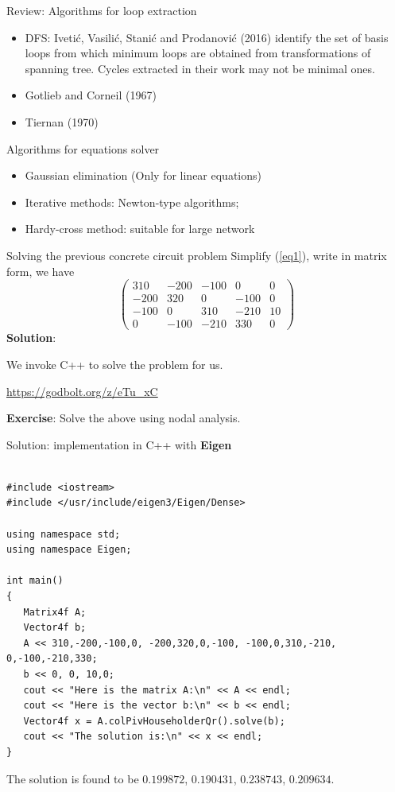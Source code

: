 \documentclass[xcolor=dvipsnames]{beamer}
\begin{document}
\begin{frame}{Review: Algorithms for loop extraction}
	\begin{itemize}
		\item DFS: Iveti\'c, Vasili\'c, Stani\'c and Prodanovi\'c (2016) identify the set of basis loops from which
		minimum loops are obtained from transformations of spanning tree. Cycles extracted in their work may not 
		be minimal ones.
		\item Gotlieb and Corneil (1967)
		\item Tiernan (1970)
	\end{itemize}
\end{frame}

\begin{frame}{Algorithms for equations solver}
\begin{itemize}
	\item Gaussian elimination (Only for linear equations)
	\item Iterative methods: {\color{red}Newton-type} algorithms;
	\item Hardy-cross method: suitable for large network
\end{itemize}
	
\end{frame}

\begin{frame}{Solving the previous concrete circuit problem}
	Simplify (\ref{eq1}), write in matrix form, we have
	\[
\left(
	\begin{array}{cccc|c}
	  310 & -200 & -100 & 0 & 0\\
	  -200 & 320 & 0 & -100 & 0\\
	  -100 & 0 & 310 & -210 & 10\\
	  0 & -100 & -210 & 330 & 0
	\end{array}	
\right)
\]
\textbf{Solution}: 

We invoke C++ to solve the problem for us.

\url{https://godbolt.org/z/eTu_xC}

\textbf{Exercise}: Solve the above using nodal analysis.

\end{frame}

\begin{frame}[fragile,shrink=30]{Solution: implementation in C++ with \textbf{Eigen}}
\begin{verbatim}

#include <iostream>
#include </usr/include/eigen3/Eigen/Dense>
 
using namespace std;
using namespace Eigen;
 
int main()
{
   Matrix4f A;
   Vector4f b;
   A << 310,-200,-100,0, -200,320,0,-100, -100,0,310,-210, 0,-100,-210,330;
   b << 0, 0, 10,0;
   cout << "Here is the matrix A:\n" << A << endl;
   cout << "Here is the vector b:\n" << b << endl;
   Vector4f x = A.colPivHouseholderQr().solve(b);
   cout << "The solution is:\n" << x << endl;
}
\end{verbatim}
	The solution is found to be $0.199872$, $0.190431$, $0.238743$, $0.209634$.
\end{frame}
\end{document}
